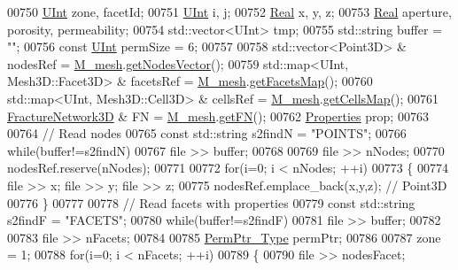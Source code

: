 \begin{DoxyCode}
00750     \hyperlink{namespaceFVCode3D_a4bf7e328c75d0fd504050d040ebe9eda}{UInt} zone, facetId;
00751     \hyperlink{namespaceFVCode3D_a4bf7e328c75d0fd504050d040ebe9eda}{UInt} i, j;
00752     \hyperlink{namespaceFVCode3D_a40c1f5588a248569d80aa5f867080e83}{Real} x, y, z;
00753     \hyperlink{namespaceFVCode3D_a40c1f5588a248569d80aa5f867080e83}{Real} aperture, porosity, permeability;
00754     std::vector<UInt> tmp;
00755     std::string buffer = \textcolor{stringliteral}{""};
00756     \textcolor{keyword}{const} \hyperlink{namespaceFVCode3D_a4bf7e328c75d0fd504050d040ebe9eda}{UInt} permSize = 6;
00757 
00758     std::vector<Point3D> & nodesRef = \hyperlink{classFVCode3D_1_1Importer_a6f1542d6c6ac192e36c8eec7dc366653}{M\_mesh}.\hyperlink{classFVCode3D_1_1Mesh3D_a04162ec60e0fe52674b3ecbb7de1185c}{getNodesVector}();
00759     std::map<UInt, Mesh3D::Facet3D> & facetsRef = \hyperlink{classFVCode3D_1_1Importer_a6f1542d6c6ac192e36c8eec7dc366653}{M\_mesh}.\hyperlink{classFVCode3D_1_1Mesh3D_a76de387da2a552e3e1210d795bc7acf9}{getFacetsMap}();
00760     std::map<UInt, Mesh3D::Cell3D> & cellsRef = \hyperlink{classFVCode3D_1_1Importer_a6f1542d6c6ac192e36c8eec7dc366653}{M\_mesh}.\hyperlink{classFVCode3D_1_1Mesh3D_ad904ef5e068c89951d77e9364e960bf3}{getCellsMap}();
00761     \hyperlink{classFVCode3D_1_1FractureNetwork3D}{FractureNetwork3D} & FN = \hyperlink{classFVCode3D_1_1Importer_a6f1542d6c6ac192e36c8eec7dc366653}{M\_mesh}.\hyperlink{classFVCode3D_1_1Mesh3D_a6ba176804035a210ee1f73348ec04aca}{getFN}();
00762     \hyperlink{classFVCode3D_1_1Properties}{Properties} prop;
00763 
00764     \textcolor{comment}{// Read nodes}
00765     \textcolor{keyword}{const} std::string s2findN = \textcolor{stringliteral}{"POINTS"};
00766     \textcolor{keywordflow}{while}(buffer!=s2findN)
00767         file >> buffer;
00768 
00769     file >> nNodes;
00770     nodesRef.reserve(nNodes);
00771 
00772     \textcolor{keywordflow}{for}(i=0; i < nNodes; ++i)
00773     \{
00774         file >> x; file >> y; file >> z;
00775         nodesRef.emplace\_back(x,y,z); \textcolor{comment}{// Point3D}
00776     \}
00777 
00778     \textcolor{comment}{// Read facets with properties}
00779     \textcolor{keyword}{const} std::string s2findF = \textcolor{stringliteral}{"FACETS"};
00780     \textcolor{keywordflow}{while}(buffer!=s2findF)
00781         file >> buffer;
00782 
00783     file >> nFacets;
00784 
00785     \hyperlink{namespaceFVCode3D_aee5ae48a57366603109f90f526a645b1}{PermPtr\_Type} permPtr;
00786 
00787     zone = 1;
00788     \textcolor{keywordflow}{for}(i=0; i < nFacets; ++i)
00789     \{
00790         file >> nodesFacet;

\end{DoxyCode}
